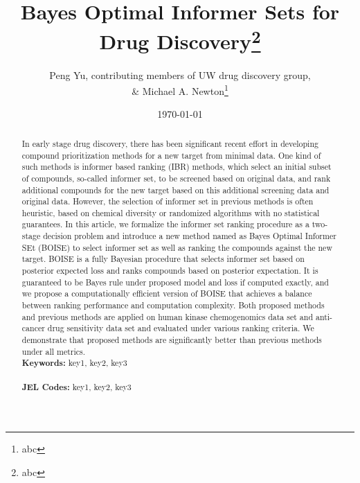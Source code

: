 \documentclass[12pt]{article}
\begin{document}
\begin{titlepage}
\title{Bayes Optimal Informer Sets for Drug Discovery\thanks{abc}}
\author{Peng Yu, {\sc contributing members of UW drug discovery group}, \\  \& Michael A. Newton\thanks{abc}}
\date{\today}
\maketitle
\begin{abstract}
In early stage drug discovery, there has been significant recent effort in developing compound prioritization methods for a new target from minimal data. One kind of such methods is informer based ranking (IBR) methods, which select an initial subset of compounds, so-called informer set, to be screened based on original data, and rank additional compounds for the new target based on this additional screening data and original data. However, the selection of informer set in previous methods is often heuristic, based on chemical diversity or randomized algorithms with no statistical guarantees. In this article, we  formalize the informer set ranking procedure as a two-stage decision problem and introduce a new method named as Bayes Optimal Informer SEt (BOISE) to select informer set as well as ranking the compounds against the new target. BOISE is a fully Bayesian procedure that selects informer set based on posterior expected loss and ranks compounds based on posterior expectation. It is guaranteed to be Bayes rule under proposed model and loss if computed exactly, and we propose a computationally efficient version of BOISE that achieves a balance between ranking performance and computation complexity. Both proposed methods and previous methods are applied on human kinase chemogenomics data set and anti-cancer drug sensitivity data set and evaluated under various ranking criteria. We demonstrate that proposed methods are significantly better than previous methods under all metrics. 
\vspace{0in}\\
\noindent\textbf{Keywords:} key1, key2, key3\\
\vspace{0in}\\
\noindent\textbf{JEL Codes:} key1, key2, key3\\

\bigskip
\end{abstract}
\setcounter{page}{0}
\thispagestyle{empty}
\end{titlepage}
\pagebreak \newpage
\end{document}

